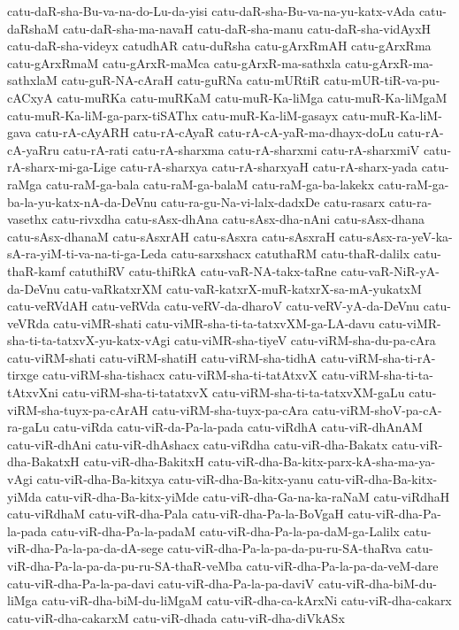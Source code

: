 {catu-daR-sha-Bu-va-na-do-Lu-da-yisi
catu-daR-sha-Bu-va-na-yu-katx-vAda
catu-daRshaM
catu-daR-sha-ma-navaH
catu-daR-sha-manu
catu-daR-sha-vidAyxH
catu-daR-sha-videyx
catudhAR
catu-duRsha
catu-gArxRmAH
catu-gArxRma
catu-gArxRmaM
catu-gArxR-maMca
catu-gArxR-ma-sathxla
catu-gArxR-ma-sathxlaM
catu-guR-NA-cAraH
catu-guRNa
catu-mURtiR
catu-mUR-tiR-va-pu-cACxyA
catu-muRKa
catu-muRKaM
catu-muR-Ka-liMga
catu-muR-Ka-liMgaM
catu-muR-Ka-liM-ga-parx-tiSAThx
catu-muR-Ka-liM-gasayx
catu-muR-Ka-liM-gava
catu-rA-cAyARH
catu-rA-cAyaR
catu-rA-cA-yaR-ma-dhayx-doLu
catu-rA-cA-yaRru
catu-rA-rati
catu-rA-sharxma
catu-rA-sharxmi
catu-rA-sharxmiV
catu-rA-sharx-mi-ga-Lige
catu-rA-sharxya
catu-rA-sharxyaH
catu-rA-sharx-yada
catu-raMga
catu-raM-ga-bala
catu-raM-ga-balaM
catu-raM-ga-ba-lakekx
catu-raM-ga-ba-la-yu-katx-nA-da-DeVnu
catu-ra-gu-Na-vi-lalx-dadxDe
catu-rasarx
catu-ra-vasethx
catu-rivxdha
catu-sAsx-dhAna
catu-sAsx-dha-nAni
catu-sAsx-dhana
catu-sAsx-dhanaM
catu-sAsxrAH
catu-sAsxra
catu-sAsxraH
catu-sAsx-ra-yeV-ka-sA-ra-yiM-ti-va-na-ti-ga-Leda
catu-sarxshacx
catuthaRM
catu-thaR-dalilx
catu-thaR-kamf
catuthiRV
catu-thiRkA
catu-vaR-NA-takx-taRne
catu-vaR-NiR-yA-da-DeVnu
catu-vaRkatxrXM
catu-vaR-katxrX-muR-katxrX-sa-mA-yukatxM
catu-veRVdAH
catu-veRVda
catu-veRV-da-dharoV
catu-veRV-yA-da-DeVnu
catu-veVRda
catu-viMR-shati
catu-viMR-sha-ti-ta-tatxvXM-ga-LA-davu
catu-viMR-sha-ti-ta-tatxvX-yu-katx-vAgi
catu-viMR-sha-tiyeV
catu-viRM-sha-du-pa-cAra
catu-viRM-shati
catu-viRM-shatiH
catu-viRM-sha-tidhA
catu-viRM-sha-ti-rA-tirxge
catu-viRM-sha-tishacx
catu-viRM-sha-ti-tatAtxvX
catu-viRM-sha-ti-ta-tAtxvXni
catu-viRM-sha-ti-tatatxvX
catu-viRM-sha-ti-ta-tatxvXM-gaLu
catu-viRM-sha-tuyx-pa-cArAH
catu-viRM-sha-tuyx-pa-cAra
catu-viRM-shoV-pa-cA-ra-gaLu
catu-viRda
catu-viR-da-Pa-la-pada
catu-viRdhA
catu-viR-dhAnAM
catu-viR-dhAni
catu-viR-dhAshacx
catu-viRdha
catu-viR-dha-Bakatx
catu-viR-dha-BakatxH
catu-viR-dha-BakitxH
catu-viR-dha-Ba-kitx-parx-kA-sha-ma-ya-vAgi
catu-viR-dha-Ba-kitxya
catu-viR-dha-Ba-kitx-yanu
catu-viR-dha-Ba-kitx-yiMda
catu-viR-dha-Ba-kitx-yiMde
catu-viR-dha-Ga-na-ka-raNaM
catu-viRdhaH
catu-viRdhaM
catu-viR-dha-Pala
catu-viR-dha-Pa-la-BoVgaH
catu-viR-dha-Pa-la-pada
catu-viR-dha-Pa-la-padaM
catu-viR-dha-Pa-la-pa-daM-ga-Lalilx
catu-viR-dha-Pa-la-pa-da-dA-sege
catu-viR-dha-Pa-la-pa-da-pu-ru-SA-thaRva
catu-viR-dha-Pa-la-pa-da-pu-ru-SA-thaR-veMba
catu-viR-dha-Pa-la-pa-da-veM-dare
catu-viR-dha-Pa-la-pa-davi
catu-viR-dha-Pa-la-pa-daviV
catu-viR-dha-biM-du-liMga
catu-viR-dha-biM-du-liMgaM
catu-viR-dha-ca-kArxNi
catu-viR-dha-cakarx
catu-viR-dha-cakarxM
catu-viR-dhada
catu-viR-dha-diVkASx
}
